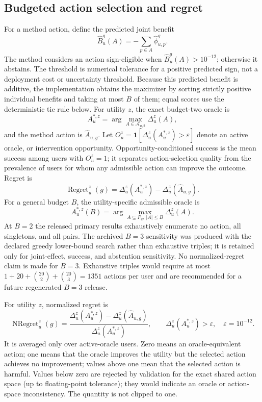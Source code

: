 \documentclass[pdflatex,sn-mathphys-num]{sn-jnl}
\begin{document}
\subsection{Budgeted action selection and regret}
For a method action, define the predicted joint benefit
\begin{equation}
\widehat B_u^g(A)=-\sum_{p\in A}\widehat\phi_{u,p}^g.
\label{eq:predicted-benefit}
\end{equation}
The method considers an action sign-eligible when $\widehat B_u^g(A)>10^{-12}$; otherwise it abstains. The threshold is numerical tolerance for a positive predicted sign, not a deployment cost or uncertainty threshold. Because this predicted benefit is additive, the implementation obtains the maximizer by sorting strictly positive individual benefits and taking at most $B$ of them; equal scores use the deterministic tie rule below. For utility $z$, the exact budget-two oracle is
\begin{equation}
A_u^{*,z}=\arg\max_{A\in\mathcal A_{u,2}}\Delta_u^z(A),
\end{equation}
and the method action is $\widehat A_{u,g}$. Let $O_u^z=\mathbf{1}[\Delta_u^z(A_u^{*,z})>\varepsilon]$ denote an active oracle, or intervention opportunity. Opportunity-conditioned success is the mean success among users with $O_u^z=1$; it separates action-selection quality from the prevalence of users for whom any admissible action can improve the outcome. Regret is
\begin{equation}
\operatorname{Regret}_u^z(g)=\Delta_u^z(A_u^{*,z})-\Delta_u^z(\widehat A_{u,g}).
\end{equation}
For a general budget $B$, the utility-specific admissible oracle is
\begin{equation}
A_u^{*,z}(B)=\arg\max_{A\subseteq P_u,\,|A|\le B}\Delta_u^z(A).
\end{equation}
At $B=2$ the released primary results exhaustively enumerate no action, all singletons, and all pairs. The archived $B=3$ sensitivity was produced with the declared greedy lower-bound search rather than exhaustive triples; it is retained only for joint-effect, success, and abstention sensitivity. No normalized-regret claim is made for $B=3$. Exhaustive triples would require at most $1+20+\binom{20}{2}+\binom{20}{3}=1351$ actions per user and are recommended for a future regenerated $B=3$ release.

For utility $z$, normalized regret is
\begin{equation}
\operatorname{NRegret}_u^z(g)=
\frac{\Delta_u^z(A_u^{*,z})-\Delta_u^z(\widehat A_{u,g})}
{\Delta_u^z(A_u^{*,z})},
\qquad \Delta_u^z(A_u^{*,z})>\varepsilon,
\quad \varepsilon=10^{-12}.
\end{equation}
It is averaged only over active-oracle users. Zero means an oracle-equivalent action; one means that the oracle improves the utility but the selected action achieves no improvement; values above one mean that the selected action is harmful. Values below zero are rejected by validation for the exact shared action space (up to floating-point tolerance); they would indicate an oracle or action-space inconsistency. The quantity is not clipped to one.
\end{document}
